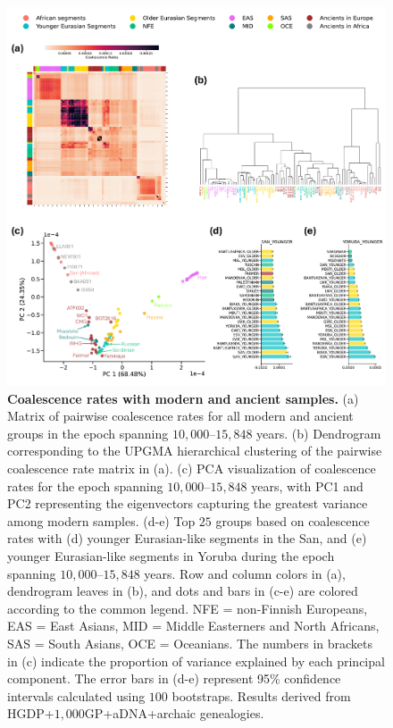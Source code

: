\begin{figure}
    \centering
    \includegraphics[width=\linewidth]{figures/gb_bta/gb_real_bta_12.pdf}
    \captionsetup{width=\textwidth+3cm}
    \caption{
    \footnotesize
    \textbf{Coalescence rates with modern and ancient samples.} (a) Matrix of pairwise coalescence rates for all modern and ancient groups in the epoch spanning $10{,}000$–$15{,}848$ years. (b) Dendrogram corresponding to the UPGMA hierarchical clustering of the pairwise coalescence rate matrix in (a). (c) PCA visualization of coalescence rates for the epoch spanning $10{,}000$–$15{,}848$ years, with PC1 and PC2 representing the eigenvectors capturing the greatest variance among modern samples. (d-e) Top $25$ groups based on coalescence rates with (d) younger Eurasian-like segments in the San, and (e) younger Eurasian-like segments in Yoruba during the epoch spanning $10{,}000$–$15{,}848$ years. Row and column colors in (a), dendrogram leaves in (b), and dots and bars in (c-e) are colored according to the common legend. NFE = non-Finnish Europeans, EAS = East Asians, MID = Middle Easterners and North Africans, SAS = South Asians, OCE = Oceanians. The numbers in brackets in (c) indicate the proportion of variance explained by each principal component. The error bars in (d-e) represent 95\% confidence intervals calculated using $100$ bootstraps. Results derived from HGDP+$1{,}000$GP+aDNA+archaic genealogies.
    }
\label{fig:gb-bta-source}
\end{figure}


